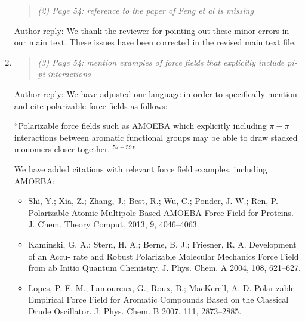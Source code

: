 \documentclass{article}
\begin{document}
\begin{enumerate}
\begin{quote}
    \textit{(2) Page 54: reference to the paper of Feng et al is missing}

	\end{quote}
    
    Author reply: We thank the reviewer for pointing out these minor errors in our main text. These issues have been corrected in
    the revised main text file. %
    
    \item \begin{quote} \textit{(3) Page 54: mention examples of force fields that explicitly include pi-pi interactions
    } \end{quote}
    
    Author reply: We have adjusted our language in order to specifically mention and cite polarizable force fields as follows: 
    
    ``Polarizable force fields such as AMOEBA which explicitly including $\pi-\pi$ interactions
    between aromatic functional groups may be able to draw stacked monomers closer together. 
    $^{57-59}$"
     
    We have added citations with relevant force field examples, including AMOEBA:
     
    \begin{itemize}
     
    \item Shi, Y.; Xia, Z.; Zhang, J.; Best, R.; Wu, C.; Ponder, J. W.; Ren, P. Polarizable Atomic
    Multipole-Based AMOEBA Force Field for Proteins. J. Chem. Theory Comput. 2013,
    9, 4046–4063.
    
    \item Kaminski, G. A.; Stern, H. A.; Berne, B. J.; Friesner, R. A. Development of an Accu-
    rate and Robust Polarizable Molecular Mechanics Force Field from ab Initio Quantum
    Chemistry. J. Phys. Chem. A 2004, 108, 621–627.
    
    \item Lopes, P. E. M.; Lamoureux, G.; Roux, B.; MacKerell, A. D. Polarizable Empirical
    Force Field for Aromatic Compounds Based on the Classical Drude Oscillator. J. Phys.
    Chem. B 2007, 111, 2873–2885.
    
    \end{itemize}

\end{enumerate}
\end{document}
